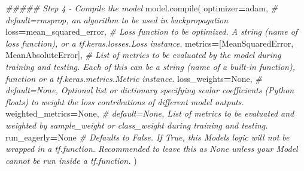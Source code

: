 \documentclass[
  a4paper,
  DIV=11,
  numbers=noendperiod]{scrreprt}
\newenvironment{Shaded}{\begin{snugshade}}{\end{snugshade}}
\newcommand{\BuiltInTok}[1]{#1}
\newcommand{\CommentTok}[1]{\textcolor[rgb]{0.56,0.35,0.01}{\textit{#1}}}
\newcommand{\NormalTok}[1]{#1}
\newcommand{\OperatorTok}[1]{\textcolor[rgb]{0.81,0.36,0.00}{\textbf{#1}}}
\newcommand{\StringTok}[1]{\textcolor[rgb]{0.31,0.60,0.02}{#1}}
\newcommand{\VariableTok}[1]{\textcolor[rgb]{0.00,0.00,0.00}{#1}}
\begin{document}
\begin{Shaded}
\begin{Highlighting}[numbers=left,,]
\CommentTok{\#\#\#\#\# Step 4 {-} Compile the model}
\NormalTok{model.}\BuiltInTok{compile}\NormalTok{(}
\NormalTok{    optimizer}\OperatorTok{=}\StringTok{\textquotesingle{}adam\textquotesingle{}}\NormalTok{, }\CommentTok{\# default=\textquotesingle{}rmsprop\textquotesingle{}, an algorithm to be used in backpropagation}
\NormalTok{    loss}\OperatorTok{=}\StringTok{\textquotesingle{}mean\_squared\_error\textquotesingle{}}\NormalTok{, }\CommentTok{\# Loss function to be optimized. A string (name of loss function), or a tf.keras.losses.Loss instance.}
\NormalTok{    metrics}\OperatorTok{=}\NormalTok{[}\StringTok{\textquotesingle{}MeanSquaredError\textquotesingle{}}\NormalTok{, }\StringTok{\textquotesingle{}MeanAbsoluteError\textquotesingle{}}\NormalTok{], }\CommentTok{\# List of metrics to be evaluated by the model during training and testing. Each of this can be a string (name of a built{-}in function), function or a tf.keras.metrics.Metric instance.}
\NormalTok{    loss\_weights}\OperatorTok{=}\VariableTok{None}\NormalTok{, }\CommentTok{\# default=None, Optional list or dictionary specifying scalar coefficients (Python floats) to weight the loss contributions of different model outputs.}
\NormalTok{    weighted\_metrics}\OperatorTok{=}\VariableTok{None}\NormalTok{, }\CommentTok{\# default=None, List of metrics to be evaluated and weighted by sample\_weight or class\_weight during training and testing.}
\NormalTok{    run\_eagerly}\OperatorTok{=}\VariableTok{None} \CommentTok{\# Defaults to False. If True, this Model\textquotesingle{}s logic will not be wrapped in a tf.function. Recommended to leave this as None unless your Model cannot be run inside a tf.function.}
\NormalTok{   )}


\end{Highlighting}
\end{Shaded}
\end{document}
